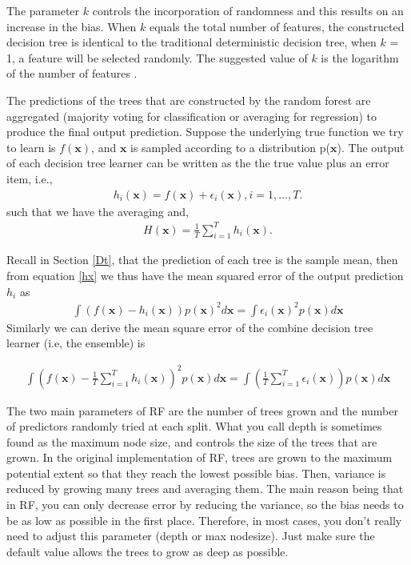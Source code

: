 The parameter $\textit{k}$ controls the incorporation of randomness and this results on an increase in the bias. When $\textit{k}$ equals the total number of features, the constructed decision tree is identical to the traditional deterministic decision tree, when $\textit{k}$ = 1, a feature will be selected randomly. The suggested value of $\textit{k}$ is the logarithm of the number of features \citep{breiman2001random}.

The predictions of the trees that are constructed by the random forest are aggregated (majority voting for classification or averaging for regression) to produce the final output prediction. Suppose the underlying true function we try to learn is $f(\textbf{x})$, and $\textbf{x}$ is sampled according to a distribution p($\textbf{x}$). The output of each decision tree learner can be written as the the true value plus an error item, i.e.,
\begin{align}
h_{i}(\textbf{x})= f(\textbf{x}) + \epsilon_{i} (\textbf{x}), i = 1, \dots,T.
\label{hx}
\end{align}
such that we have the averaging and, 
\begin{align}
H(\textbf{x})= \frac{1}{T}\sum_{i=1}^{T} h_{i}(\textbf{x}). 
\label{averageRF}
\end{align}
\citep{zhou2012ensemble}

Recall in Section \ref{Dt}, that the prediction of  each tree is the sample mean, then from equation \ref{hx} we thus have the mean squared error of the output prediction $h_i$ as 
\begin{align}
\int (f(\textbf{x})-h_{i}(\textbf{x}))p(\textbf{x})^2d\textbf{x} = \int \epsilon_{i} (\textbf{x})^2 p(\textbf{x})d\textbf{x}
\end{align}
Similarly we can derive the mean square error of the combine decision tree learner (i.e, the ensemble) is 

\begin{align}
\int \left(f(\textbf{x}) - \frac{1}{T}\sum_{i=1}^{T} h_{i}(\textbf{x}) \right)^2  p(\textbf{x})d\textbf{x} = \int \left( \frac{1}{T}\sum_{i=1}^{T} \epsilon_{i}(\textbf{x})\right)p(\textbf{x})d\textbf{x}
\end{align} 


The two main parameters of RF are the number of trees grown and the number of predictors randomly tried at each split. What you call depth is sometimes found as the maximum node size, and controls the size of the trees that are grown. In the original implementation of RF, trees are grown to the maximum potential extent so that they reach the lowest possible bias. Then, variance is reduced by growing many trees and averaging them. The main reason being that in RF, you can only decrease error by reducing the variance, so the bias needs to be as low as possible in the first place. Therefore, in most cases, you don't really need to adjust this parameter (depth or max nodesize). Just make sure the default value allows the trees to grow as deep as possible.

